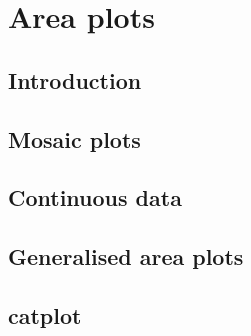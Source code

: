 

\chapter{Area plots}

\section{Introduction}\label{sec:introduction}

\section{Mosaic plots}\label{sec:mosaic_plots}

\section{Continuous data}\label{sec:continuous_data} 

\section{Generalised area plots}\label{sec:generalisation}

\section{catplot}\label{sec:catplot}


